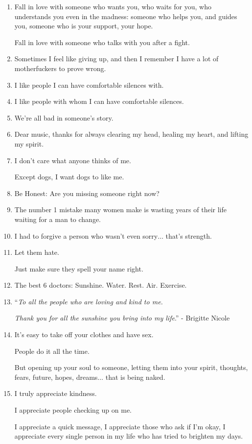 \documentclass{article}
\numberwithin{equation}{section}
\begin{document}
\begin{enumerate}
    Everybody is not genuinely happy for you.
    \item Fall in love with someone who wants you, who waits for you, who understands you even in the madness: someone who helps you, and guides you, someone who is your support, your hope.
    
    Fall in love with someone who talks with you after a fight.
    \item Sometimes I feel like giving up, and then I remember I have a lot of motherfuckers to prove wrong.
    \item I like people I can have comfortable silences with.
    \item I like people with whom I can have comfortable silences.
    \item We're all bad in someone's story.
    \item Dear music, thanks for always clearing my head, healing my heart, and lifting my spirit.
    \item I don't care what anyone thinks of me.
    
    Except dogs, I want dogs to like me.
    \item Be Honest: Are you missing someone right now?
    \item The number 1 mistake many women make is wasting years of their life waiting for a man to change.
    \item I had to forgive a person who wasn't even sorry$\ldots$ that's strength.
    \item Let them hate.
    
    Just make sure they spell your name right.
    \item The best 6 doctors: Sunshine. Water. Rest. Air. Exercise.
    \item ``\textit{To all the people who are loving and kind to me.}
    
    \textit{Thank you for all the sunshine you bring into my life}.'' - Brigitte Nicole
    \item It's easy to take off your clothes and have sex.
    
    People do it all the time.
    
    But opening up your soul to someone, letting them into your spirit, thoughts, fears, future, hopes, dreams$\ldots$ that is being naked.
    \item I truly appreciate kindness.
    
    I appreciate people checking up on me.
    
    I appreciate a quick message, I appreciate those who ask if I'm okay, I appreciate every single person in my life who has tried to brighten my days.
    

\end{enumerate}
\end{document}

